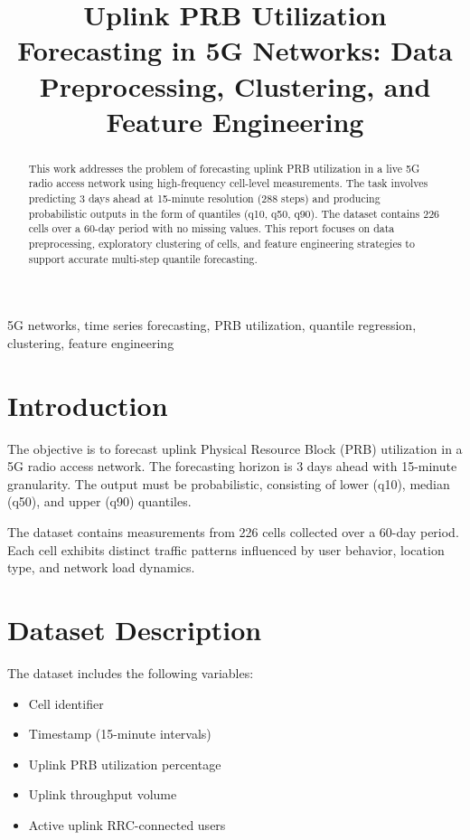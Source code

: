 \documentclass[conference]{IEEEtran}
\begin{document}
\title{Uplink PRB Utilization Forecasting in 5G Networks: Data Preprocessing, Clustering, and Feature Engineering}

\author{
}

\maketitle

\begin{abstract}
This work addresses the problem of forecasting uplink PRB utilization in a live 5G radio access network using high-frequency cell-level measurements. The task involves predicting 3 days ahead at 15-minute resolution (288 steps) and producing probabilistic outputs in the form of quantiles (q10, q50, q90). The dataset contains 226 cells over a 60-day period with no missing values. This report focuses on data preprocessing, exploratory clustering of cells, and feature engineering strategies to support accurate multi-step quantile forecasting.
\end{abstract}

\begin{IEEEkeywords}
5G networks, time series forecasting, PRB utilization, quantile regression, clustering, feature engineering
\end{IEEEkeywords}

\section{Introduction}
The objective is to forecast uplink Physical Resource Block (PRB) utilization in a 5G radio access network. The forecasting horizon is 3 days ahead with 15-minute granularity. The output must be probabilistic, consisting of lower (q10), median (q50), and upper (q90) quantiles.

The dataset contains measurements from 226 cells collected over a 60-day period. Each cell exhibits distinct traffic patterns influenced by user behavior, location type, and network load dynamics.

\section{Dataset Description}
The dataset includes the following variables:
\begin{itemize}
\item Cell identifier
\item Timestamp (15-minute intervals)
\item Uplink PRB utilization percentage
\item Uplink throughput volume
\item Active uplink RRC-connected users
\end{itemize}
\end{document}
